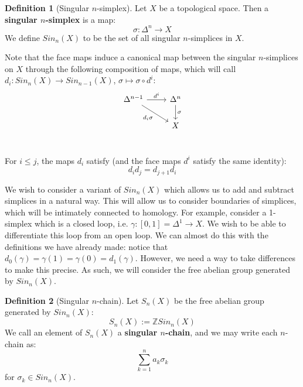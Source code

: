 \documentclass[11pt, oneside]{amsart}   	%
\theoremstyle{definition}
\newtheorem{definition}{Definition}[section]
\begin{document}
\begin{definition}[Singular $n$-simplex]
	Let $X$ be a topological space. Then a \textbf{singular $n$-simplex} is a map:
	\begin{equation}
		\sigma : \Delta^n\rightarrow X
	\end{equation}
	We define $Sin_n(X)$ to be the set of all singular $n$-simplices in $X$. 
\end{definition}

Note that the face maps induce a canonical map between the singular $n$-simplices on $X$ through the 
following composition of maps, which will call $d_i : Sin_n(X)\rightarrow Sin_{n - 1}(X)$, $\sigma\mapsto \sigma\circ d^i$:
\[
	\begin{tikzcd}
		\Delta^{n - 1}\arrow[r, "d^i"]\arrow[dr, swap, "d_i\sigma"] & \Delta^n\arrow[d, "\sigma"] \\
		 & X \\
	\end{tikzcd}
\]

For $i\leq j$, the maps $d_i$ satisfy (and the face maps $d^i$ satisfy the same identity): 
\begin{equation}
	d_i d_j = d_{j + 1} d_i
\end{equation}

We wish to consider a variant of $Sin_n(X)$ which allows us to add and subtract simplices in a natural 
way. This will allow us to consider boundaries of simplices, which will be intimately connected to homology.  
For example, consider a 1-simplex which is a closed loop, i.e. $\gamma : [0, 1] = \Delta^1\rightarrow X$. 
We wish to be able to differentiate this loop from an open loop. We can almost do this with the definitions 
we have already made: notice that $d_0(\gamma) = \gamma(1) = \gamma(0) = d_1(\gamma)$. However, 
we need a way to take differences to make this precise. As such, we will consider the free abelian 
group generated by $Sin_n(X)$.
\begin{definition}[Singular $n$-chain]
	Let $S_n(X)$ be the free abelian group generated by $Sin_n(X)$:
	\begin{equation}
		S_n(X) := \mathbb Z Sin_n(X)
	\end{equation}
	We call an element of $S_n(X)$ a \textbf{singular $n$-chain}, and we may write each $n$-chain as:
	\begin{equation}
		\sum_{k = 1}^n a_k\sigma_k
	\end{equation}
	for $\sigma_k\in Sin_n(X)$. 
\end{definition}
\end{document}
